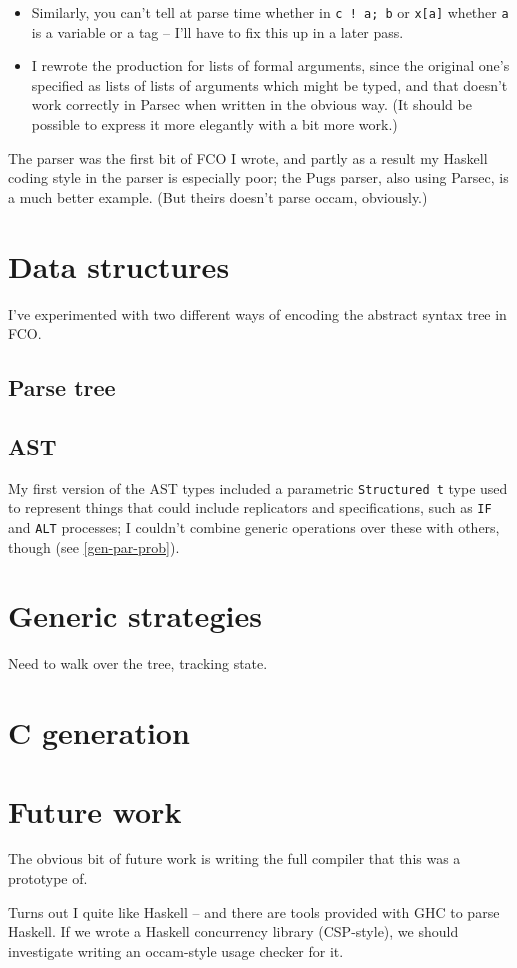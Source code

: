\documentclass[a4paper,12pt]{article}
\def\occam{{\sffamily occam}\xspace}
\begin{document}
\begin{itemize}
\item Similarly, you can't tell at parse time whether in \verb|c ! a; b|
or \verb|x[a]| whether \verb|a| is a variable or a tag -- I'll have to
fix this up in a later pass.

\item I rewrote the production for lists of formal arguments, since the
original one's specified as lists of lists of arguments which might be
typed, and that doesn't work correctly in Parsec when written in the
obvious way. (It should be possible to express it more elegantly with a
bit more work.)

\end{itemize}

The parser was the first bit of FCO I wrote, and partly as a result my
Haskell coding style in the parser is especially poor; the Pugs parser,
also using Parsec, is a much better example. (But theirs doesn't parse
\occam, obviously.)

\section{Data structures}

I've experimented with two different ways of encoding the abstract
syntax tree in FCO.

\subsection{Parse tree}

\subsection{AST}

My first version of the AST types included a parametric
\verb|Structured t| type used to represent things that could include
replicators and specifications, such as \verb|IF| and \verb|ALT|
processes; I couldn't combine generic operations over these with others,
though (see \ref{gen-par-prob}).

\section{Generic strategies}

Need to walk over the tree, tracking state.

\section{C generation}

\section{Future work}

The obvious bit of future work is writing the full compiler that this
was a prototype of.

Turns out I quite like Haskell -- and there are tools provided with GHC
to parse Haskell. If we wrote a Haskell concurrency library (CSP-style),
we should investigate writing an \occam-style usage checker for it.



\end{document}
